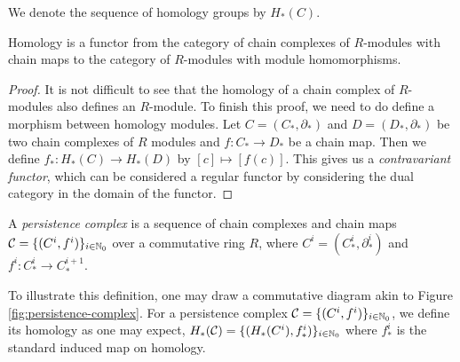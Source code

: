 We denote the sequence of homology groups by $H_*(C)$.

\begin{lemma} \label{lem:homology-functor}
    Homology is a functor from the category of chain complexes of $R$-modules with chain maps to the category of $R$-modules with module homomorphisms.
\end{lemma}

\begin{proof}
    It is not difficult to see that the homology of a chain complex of $R$-modules also defines an $R$-module. To finish this proof, we need to do define a morphism between homology modules. Let $C = (C_*, \partial_*)$ and $D = (D_*, \partial_*)$ be two chain complexes of $R$ modules and $f: C_* \to D_*$ be a chain map. Then we define $f_*: H_*(C) \to H_*(D)$ by $[c] \mapsto [f(c)]$. This gives us a \emph{contravariant functor}, which can be considered a regular functor by considering the dual category in the domain of the functor.
\end{proof}

\begin{definition} \label{def:persistence-complex}
    A \emph{persistence complex} is a sequence of chain complexes and chain maps $\mathcal C = \{(C^i, f^i)\}_{i \in \mathbb N_0}$ over a commutative ring $R$, where $C^i = (C_*^i, \partial_*^i)$ and $f^i: C_*^i \to C_*^{i+1}$.
\end{definition}

To illustrate this definition, one may draw a commutative diagram akin to Figure \ref{fig:persistence-complex}. For a persistence complex $\mathcal C = \{(C^i, f^i)\}_{i \in \mathbb N_0}$, we define its homology as one may expect, $H_*(\mathcal C) = \{(H_*(C^i), f_*^i)\}_{i \in \mathbb N_0}$ where $f_*^i$ is the standard induced map on homology.

